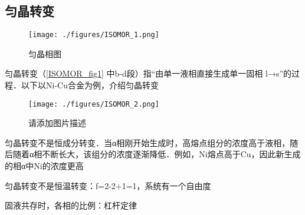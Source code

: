 
\subsection{匀晶转变}

\begin{figure}[ht]
\centering
\texttt{[image: ./figures/ISOMOR\_1.png]}
\caption{匀晶相图} \label{ISOMOR_fig1}
\end{figure}

匀晶转变（\autoref{ISOMOR_fig1} 中b-d段）指“由单一液相直接生成单一固相 l→s”的过程．以下以Ni-Cu合金为例，介绍匀晶转变
\begin{figure}[ht]
\centering
\texttt{[image: ./figures/ISOMOR\_2.png]}
\caption{请添加图片描述} \label{ISOMOR_fig2}
\end{figure}

匀晶转变不是恒成分转变．当α相刚开始生成时，高熔点组分的浓度高于液相，随后随着α相不断长大，该组分的浓度逐渐降低．例如，Ni熔点高于Cu，因此新生成的相α中Ni的浓度更高

匀晶转变不是恒温转变：f=2-2+1=1，系统有一个自由度

固液共存时，各相的比例：杠杆定律

